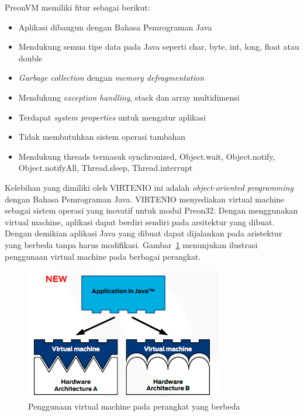 \documentclass[a4paper,twoside]{article}
\begin{document}
\begin{enumerate}
PreonVM memiliki fitur sebagai berikut:
\begin{itemize}
	\item Aplikasi dibangun dengan Bahasa Pemrograman Java
	\item Mendukung semua tipe data pada Java seperti char, byte, int, long, float atau double
	\item \textit{Garbage collection} dengan \textit{memory defragmentation}
	\item Mendukung \textit{exception handling}, stack dan array multidimensi
	\item Terdapat \textit{system properties} untuk mengatur aplikasi
	\item Tidak membutuhkan sistem operasi tambahan
	\item Mendukung threads termasuk synchronized, Object.wait, Object.notify, Object.notifyAll, Thread.sleep, Thread.interrupt
\end{itemize}

Kelebihan yang dimiliki oleh VIRTENIO ini adalah \textit{object-oriented programming} dengan Bahasa Pemrograman Java. VIRTENIO menyediakan virtual machine sebagai sistem operasi yang inovatif untuk modul Preon32. Dengan menggunakan virtual machine, aplikasi dapat berdiri sendiri pada arsitektur yang dibuat. Dengan demikian aplikasi Java yang dibuat dapat dijalankan pada aristektur yang berbeda tanpa harus modifikasi. Gambar~\ref{fig:PreonVM} menunjukan ilustrasi penggunaan virtual machine pada berbagai perangkat. 

\begin{figure} [H]
	\centering  
	\includegraphics[scale=0.7]{Gambar/PreonVM}  
	\caption[Penggunaan virtual machine pada perangkat yang berbeda]{Penggunaan virtual machine pada perangkat yang berbeda} 
	\label{fig:PreonVM} 
\end{figure} 


\end{enumerate}
\end{document}
